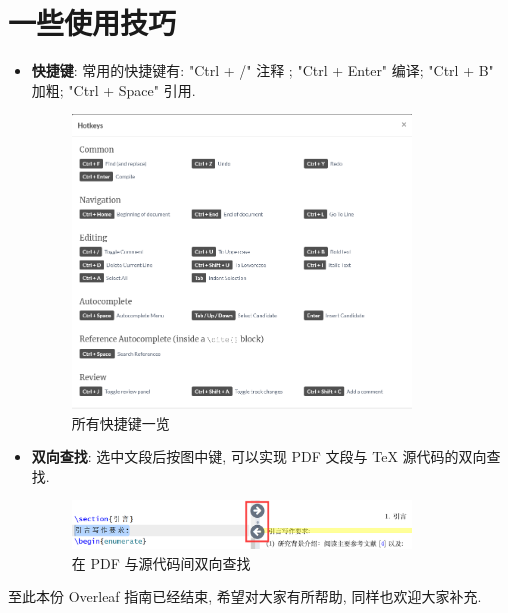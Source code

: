 \documentclass{formatBook}
\begin{document}
\section{一些使用技巧}\label{header-n57}

\begin{itemize}
    \item \textbf{快捷键}: 常用的快捷键有: "Ctrl + /" 注释 ; "Ctrl + Enter" 编译; "Ctrl + B" 加粗; "Ctrl + Space" 引用.
          \begin{figure}[H]
              \centering
              \includegraphics[width=0.85\textwidth]{Guidepics/20210415185428.png}
              \caption{所有快捷键一览}
          \end{figure}
    \item \textbf{双向查找}: 选中文段后按图中键, 可以实现 PDF 文段与 TeX 源代码的双向查找.
          \begin{figure}[H]
              \centering
              \includegraphics[width=0.85\textwidth]{Guidepics/20210415184949.png}
              \caption{在 PDF 与源代码间双向查找}
          \end{figure}
\end{itemize}

至此本份 Overleaf 指南已经结束, 希望对大家有所帮助, 同样也欢迎大家补充.
% 
\end{document}
